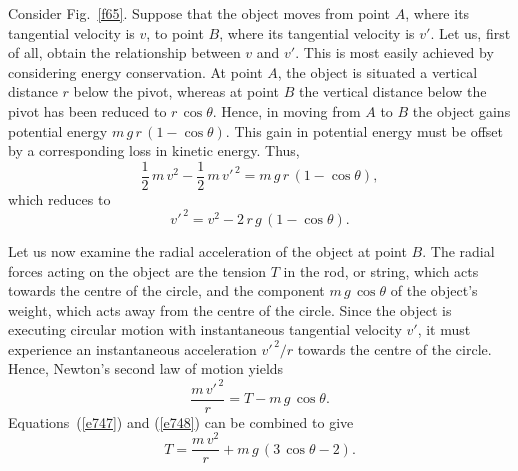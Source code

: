 Consider Fig.~\ref{f65}. Suppose that the object moves from point $A$, where its tangential 
velocity is $v$, to
point $B$, where its tangential velocity is $v'$. Let us, first of all, obtain the relationship
between $v$ and $v'$. This is most easily achieved by considering energy conservation.
At point $A$, the object is situated a vertical distance $r$ below the pivot, whereas at point $B$ the
vertical distance below the pivot has been reduced to $r\,\cos\theta$. Hence, in moving
from $A$ to $B$ the object gains potential energy $m\,g\,r\,(1-\cos\theta)$. This gain
in potential energy must be offset by a corresponding loss in kinetic energy. Thus,
\begin{equation}
\frac{1}{2}\,m\,v^2 - \frac{1}{2}\,m\,{v'}^{\,2} = m\,g\,r\,(1-\cos\theta),
\end{equation}
which reduces to
\begin{equation}\label{e747}
{v'}^{\,2} = v^2 - 2\,r\,g\,(1-\cos\theta).
\end{equation}

Let us now examine the radial acceleration of the object at point $B$. The radial forces
acting on the object are the tension $T$ in the rod, or string, which acts towards
the centre of the circle, and the component $m\,g\,\cos\theta$ of the object's weight,
which acts away from the centre of the circle. Since the object is executing
circular motion with instantaneous tangential velocity $v'$, it must experience
an instantaneous acceleration ${v'}^{\,2}/r$ towards the centre of the circle. Hence,
Newton's second law of motion yields
\begin{equation}\label{e748}
\frac{m\,{v'}^{\,2}}{r} = T - m\,g\,\cos\theta.
\end{equation}
Equations~(\ref{e747}) and (\ref{e748}) can be combined to give
\begin{equation}\label{e799}
T = \frac{m\,v^2}{r} + m\,g\,(3\,\cos\theta -2).
\end{equation}

